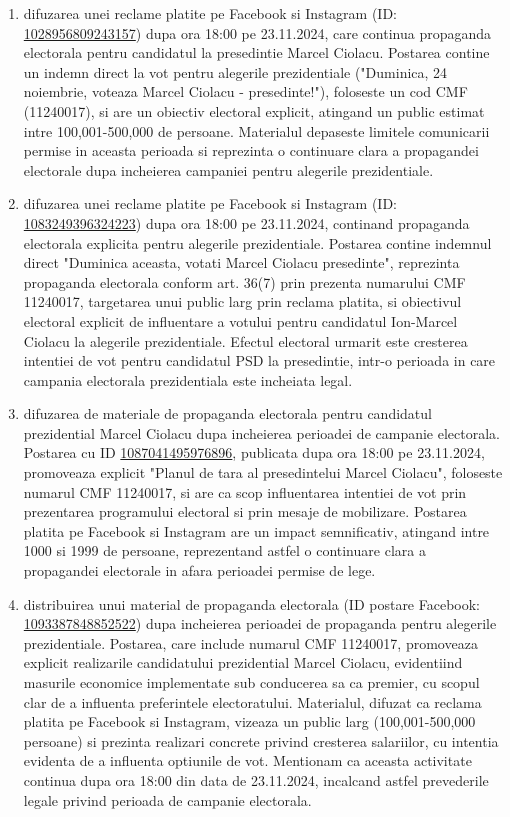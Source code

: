 \documentclass[a4paper,12pt]{article}
\begin{document}
\begin{enumerate}[leftmargin=*, label=\arabic*.)]
    \item difuzarea unei reclame platite pe Facebook si Instagram (ID: \href{https://www.facebook.com/ads/library/?id=1028956809243157}{1028956809243157}) dupa ora 18:00 pe 23.11.2024, care continua propaganda electorala pentru candidatul la presedintie Marcel Ciolacu. Postarea contine un indemn direct la vot pentru alegerile prezidentiale ("Duminica, 24 noiembrie, voteaza Marcel Ciolacu - presedinte!"), foloseste un cod CMF (11240017), si are un obiectiv electoral explicit, atingand un public estimat intre 100,001-500,000 de persoane. Materialul depaseste limitele comunicarii permise in aceasta perioada si reprezinta o continuare clara a propagandei electorale dupa incheierea campaniei pentru alegerile prezidentiale.
    \item difuzarea unei reclame platite pe Facebook si Instagram (ID: \href{https://www.facebook.com/ads/library/?id=1083249396324223}{1083249396324223}) dupa ora 18:00 pe 23.11.2024, continand propaganda electorala explicita pentru alegerile prezidentiale. Postarea contine indemnul direct "Duminica aceasta, votati Marcel Ciolacu presedinte", reprezinta propaganda electorala conform art. 36(7) prin prezenta numarului CMF 11240017, targetarea unui public larg prin reclama platita, si obiectivul electoral explicit de influentare a votului pentru candidatul Ion-Marcel Ciolacu la alegerile prezidentiale. Efectul electoral urmarit este cresterea intentiei de vot pentru candidatul PSD la presedintie, intr-o perioada in care campania electorala prezidentiala este incheiata legal.
    \item difuzarea de materiale de propaganda electorala pentru candidatul prezidential Marcel Ciolacu dupa incheierea perioadei de campanie electorala. Postarea cu ID \href{https://www.facebook.com/ads/library/?id=1087041495976896}{1087041495976896}, publicata dupa ora 18:00 pe 23.11.2024, promoveaza explicit "Planul de tara al presedintelui Marcel Ciolacu", foloseste numarul CMF 11240017, si are ca scop influentarea intentiei de vot prin prezentarea programului electoral si prin mesaje de mobilizare. Postarea platita pe Facebook si Instagram are un impact semnificativ, atingand intre 1000 si 1999 de persoane, reprezentand astfel o continuare clara a propagandei electorale in afara perioadei permise de lege.
    \item distribuirea unui material de propaganda electorala (ID postare Facebook: \href{https://www.facebook.com/ads/library/?id=1093387848852522}{1093387848852522}) dupa incheierea perioadei de propaganda pentru alegerile prezidentiale. Postarea, care include numarul CMF 11240017, promoveaza explicit realizarile candidatului prezidential Marcel Ciolacu, evidentiind masurile economice implementate sub conducerea sa ca premier, cu scopul clar de a influenta preferintele electoratului. Materialul, difuzat ca reclama platita pe Facebook si Instagram, vizeaza un public larg (100,001-500,000 persoane) si prezinta realizari concrete privind cresterea salariilor, cu intentia evidenta de a influenta optiunile de vot. Mentionam ca aceasta activitate continua dupa ora 18:00 din data de 23.11.2024, incalcand astfel prevederile legale privind perioada de campanie electorala.

\end{enumerate}
\end{document}
